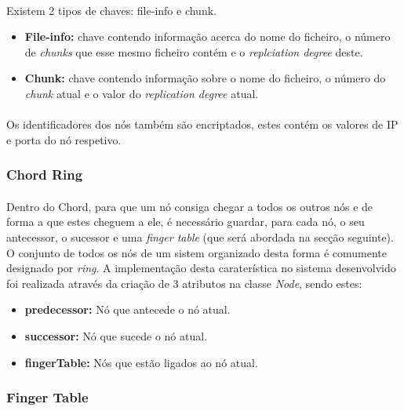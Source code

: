 \documentclass[11pt,oneside]{book}
\begin{document}
    \paragraph{}
    Existem 2 tipos de chaves: file-info e chunk. 
    \begin{itemize}
        \item \textbf{File-info:} chave contendo informação acerca do nome do ficheiro, o número
        de \textit{chunks} que esse mesmo ficheiro contém e o \textit{replciation degree} deste.
        \item \textbf{Chunk:} chave contendo informação sobre o nome do ficheiro, o número do
        \textit{chunk} atual e o valor do \textit{replication degree} atual.
    \end{itemize}

    \paragraph{}
    Os identificadores dos nós também são encriptados, estes contém os valores de IP e porta do
    nó respetivo.

    \subsubsection{Chord Ring}
    \paragraph{}
    Dentro do Chord, para que um nó consiga chegar a todos os outros nós e de forma a que estes
    cheguem a ele, é necessário guardar, para cada nó, o seu antecessor, o sucessor e uma 
    \textit{finger table} (que será abordada na secção seguinte). O conjunto de todos os nós
    de um sistem organizado desta forma é comumente designado por \textit{ring}. A implementação 
    desta caraterística no sistema desenvolvido foi realizada através da criação de 3 atributos 
    na classe \textit{Node}, sendo estes:
    \begin{itemize}
        \item \textbf{predecessor:} Nó que antecede o nó atual.
        \item \textbf{successor:} Nó que sucede o nó atual.
        \item \textbf{fingerTable:} Nós que estão ligados ao nó atual.
    \end{itemize}

    \subsubsection{Finger Table}
\end{document}
